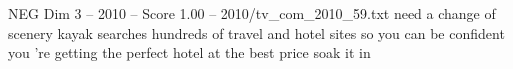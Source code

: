 \begin{textsample}{NEG Dim 3 – 2010 – Score 1.00 – 2010/tv\_com\_2010\_59.txt}  \label{ex:f3_neg_058}
need a change of scenery kayak searches hundreds of travel and hotel sites so you can be confident you 're getting the perfect hotel at the best price soak it in

\end{textsample}
